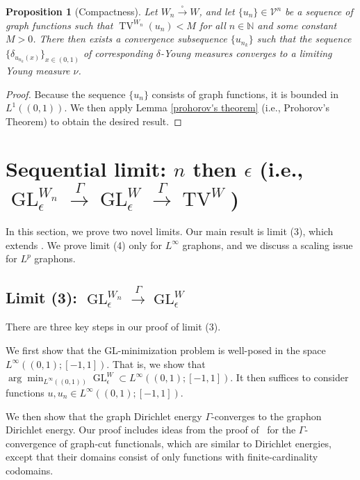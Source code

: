 \documentclass[11pt]{amsart}
\newtheorem{proposition}{Proposition}[section]
\def\N{\mathbb{N}}
\def\ep{\epsilon}
\def\calV{\mathcal{V}}
\def\gamra{\stackrel{\Gamma}{\longrightarrow}}
\def\sqra{\stackrel{\square}{\longrightarrow}}
\def\GL{\operatorname{GL}}
\def\TV{\operatorname{TV}}
\numberwithin{equation}{section}
\begin{document}
{{\begin{proposition}[Compactness]
Let $W_n \sqra W$, and let {$\{u_n\} \in \calV^n$} be a sequence of graph functions such that $ \TV^{W_n}(u_n) < M$ for all {$n \in \N$} and some {constant} $M > 0$. {There then} exists a convergence subsequence {$\{u_{n_k}\}$} {such} that the {sequence $\{\delta_{u_{n_k}(x)}\}_{x\in (0,1)}$ of corresponding $\delta$-Young measures} converges to a limiting Young measure $\nu$. 
\end{proposition}

\begin{proof}
    Because {the sequence} $\{u_n\}$ consists of graph functions, it {is} bounded in $L^1((0,1))$. {We then} apply Lemma \ref{prohorov's theorem} ({i.e.,} Prohorov's Theorem) to obtain the {desired} result. 
\end{proof}




\section{\texorpdfstring{Sequential limit: $n$ then $\ep$ (i.e., $\GL^{W_n}_\ep \gamra \GL^W_\ep \gamra \TV^W$)}{Sequential limit: n then ep}  }   \label{sec: sequential n then ep part n} 

In this section, we prove two novel limits. Our main result is limit (3), which extends \cite[Theorem 12]{braides2020cut}. We prove limit (4) only for $L^\infty$ graphons, and we discuss a scaling issue for $L^p$ graphons.
 


\subsection{\texorpdfstring{Limit (3): $\GL^{W_n}_\ep \gamra \GL^W_\ep$}{Limit (3)}}
\label{sec: limit (3)}

There are three key steps in our proof of limit (3).

We first show that the GL-minimization problem is well-posed in the space $L^\infty((0,1);[-1,1])$. That is, we show that $\arg\min_{L^\infty((0,1))} \GL^W_\ep \subset L^\infty((0,1);[-1,1])$. It then suffices to consider functions $u, u_n \in L^\infty((0,1);[-1,1])$. 

We then show that the graph Dirichlet energy $\Gamma$-converges to the graphon Dirichlet energy. Our proof includes ideas from the proof of~\cite[Lemma 11]{braides2020cut} for the $\Gamma$-convergence of graph-cut functionals, which are similar to Dirichlet energies, except that their domains consist of only
functions with finite-cardinality codomains. 


}}
\end{document}
